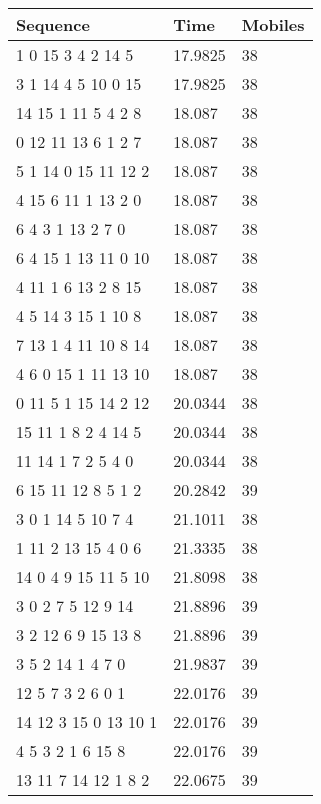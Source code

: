 	\begin{table}[H]
		\centering
		\begin{tabular}{|l|l|l|}
		\hline
		Sequence             & Time    & Mobiles \\ \hline
		1 0 15 3 4 2 14 5    & 17.9825 & 38      \\ \hline
		3 1 14 4 5 10 0 15   & 17.9825 & 38      \\ \hline
		14 15 1 11 5 4 2 8   & 18.087  & 38      \\ \hline
		0 12 11 13 6 1 2 7   & 18.087  & 38      \\ \hline
		5 1 14 0 15 11 12 2  & 18.087  & 38      \\ \hline
		4 15 6 11 1 13 2 0   & 18.087  & 38      \\ \hline
		6 4 3 1 13 2 7 0     & 18.087  & 38      \\ \hline
		6 4 15 1 13 11 0 10  & 18.087  & 38      \\ \hline
		4 11 1 6 13 2 8 15   & 18.087  & 38      \\ \hline
		4 5 14 3 15 1 10 8   & 18.087  & 38      \\ \hline
		7 13 1 4 11 10 8 14  & 18.087  & 38      \\ \hline
		4 6 0 15 1 11 13 10  & 18.087  & 38      \\ \hline
		0 11 5 1 15 14 2 12  & 20.0344 & 38      \\ \hline
		15 11 1 8 2 4 14 5   & 20.0344 & 38      \\ \hline
		11 14 1 7 2 5 4 0    & 20.0344 & 38      \\ \hline
		6 15 11 12 8 5 1 2   & 20.2842 & 39      \\ \hline
		3 0 1 14 5 10 7 4    & 21.1011 & 38      \\ \hline
		1 11 2 13 15 4 0 6   & 21.3335 & 38      \\ \hline
		14 0 4 9 15 11 5 10  & 21.8098 & 38      \\ \hline
		3 0 2 7 5 12 9 14    & 21.8896 & 39      \\ \hline
		3 2 12 6 9 15 13 8   & 21.8896 & 39      \\ \hline
		3 5 2 14 1 4 7 0     & 21.9837 & 39      \\ \hline
		12 5 7 3 2 6 0 1     & 22.0176 & 39      \\ \hline
		14 12 3 15 0 13 10 1 & 22.0176 & 39      \\ \hline
		4 5 3 2 1 6 15 8     & 22.0176 & 39      \\ \hline
		13 11 7 14 12 1 8 2  & 22.0675 & 39      \\ \hline

\end{tabular}
\end{table}
